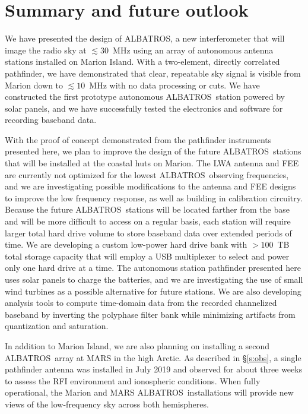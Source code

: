 \documentclass{ws-jai}
\def\albatros{ALBATROS}
\begin{document}
\section{Summary and future outlook}

We have presented the design of \albatros, a new interferometer that
will image the radio sky at $\lesssim30$~MHz using an array of
autonomous antenna stations installed on Marion Island.  With a
two-element, directly correlated pathfinder, we have demonstrated that
clear, repeatable sky signal is visible from Marion down to
$\lesssim10$~MHz with no data processing or cuts.  We have constructed
the first prototype autonomous \albatros\ station powered by solar
panels, and we have successfully tested the electronics and software
for recording baseband data.

With the proof of concept demonstrated from the pathfinder instruments
presented here, we plan to improve the design of the future
\albatros\ stations that will be installed at the coastal huts on
Marion.  The LWA antenna and FEE are currently not optimized for the
lowest \albatros\ observing frequencies, and we are investigating
possible modifications to the antenna and FEE designs to improve the
low frequency response, as well as building in calibration circuitry.
Because the future \albatros\ stations will be located farther from
the base and will be more difficult to access on a regular basis, each
station will require larger total hard drive volume to store baseband
data over extended periods of time.  We are developing a custom
low-power hard drive bank with $>100$~TB total storage capacity that
will employ a USB multiplexer to select and power only one hard drive
at a time.  The autonomous station pathfinder presented here uses
solar panels to charge the batteries, and we are investigating the use
of small wind turbines as a possible alternative for future stations.
We are also developing analysis tools to compute time-domain data from
the recorded channelized baseband by inverting the polyphase filter
bank while minimizing artifacts from quantization and saturation.

In addition to Marion Island, we are also planning on installing a
second \albatros\ array at MARS in the high Arctic.  As described in
\S\ref{s:obs}, a single pathfinder antenna was installed in July 2019
and observed for about three weeks to assess the RFI environment and
ionospheric conditions.  When fully operational, the Marion and MARS
\albatros\ installations will provide new views of the low-frequency
sky across both hemispheres.
\end{document}
